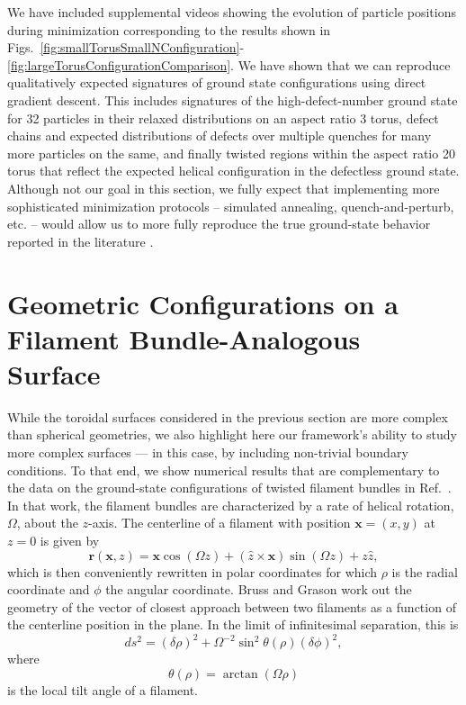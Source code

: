 \documentclass[preprint,12pt]{elsarticle}
\newcommand{\bs}[1]{\boldsymbol{#1}}
\begin{document}
We have included supplemental videos showing the evolution of particle positions during minimization corresponding to the results shown in Figs.~\ref{fig:smallTorusSmallNConfiguration}-\ref{fig:largeTorusConfigurationComparison}. We have shown that we can reproduce qualitatively expected signatures of ground state configurations using direct gradient descent. This includes signatures of the high-defect-number ground state for 32 particles in their relaxed distributions on an aspect ratio 3 torus, defect chains and  expected distributions of defects over multiple quenches for many more particles on the same, and finally twisted regions within the aspect ratio 20 torus that reflect the expected helical configuration in the defectless ground state. Although not our goal in this section, we fully expect that implementing more sophisticated minimization protocols -- simulated annealing, quench-and-perturb, etc. -- would allow us to more fully reproduce the true ground-state behavior reported in the literature \cite{giomi2008elastic}. 

\section{Geometric Configurations on a Filament Bundle-Analogous Surface} \label{sec:example2}

While the toroidal surfaces considered in the previous section are more complex than spherical geometries, we also highlight here our framework's ability to study more complex surfaces --- in this case, by including non-trivial boundary conditions.
To that end, we show numerical results that are complementary to the data on the ground-state configurations of twisted filament bundles in Ref.~\cite{bruss2012non}.
In that work, the filament bundles are characterized by a rate of helical rotation, $\Omega$, about the $z$-axis.
The centerline of a filament  with position $\bs{x}=(x,y)$ at $z=0$ is given by
\begin{equation}
    \bs{r}(\bs{x},z) = \bs{x} \cos(\Omega z) + (\hat{z} \times \bs{x}) \sin(\Omega z) + z \hat{z},
\end{equation}
which is then conveniently rewritten in polar coordinates for which $\rho$ is the radial coordinate and $\phi$ the angular coordinate. Bruss and Grason work out \cite{bruss2012non} the geometry of the vector of closest approach between two filaments as a function of the centerline position in the plane. In the limit of infinitesimal separation, this is
\begin{equation}\label{eq:siloMetric}
   ds^2 = (\delta\rho)^2 + \Omega^{-2}\sin^{2}{\theta(\rho)}(\delta\phi)^2, 
\end{equation}
where 
\begin{equation}
    \theta(\rho) = \arctan\left(\Omega\rho\right)
\end{equation}
is the local tilt angle of a filament. 
\end{document}
